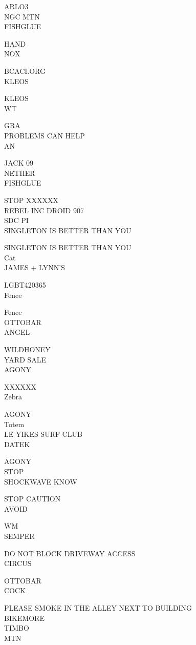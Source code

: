 \documentclass[10pt,letterpaper]{article}
\begin{document}
ARLO3\\
NGC MTN\\
FISHGLUE

HAND\\
NOX

BCACI.ORG\\
KLEOS

KLEOS\\
WT

GRA\\
PROBLEMS CAN HELP\\
AN

JACK 09\\
NETHER\\
FISHGLUE

STOP XXXXXX\\
REBEL INC DROID 907\\
SDC PI\\
SINGLETON IS BETTER THAN YOU

SINGLETON IS BETTER THAN YOU\\
Cat\\
JAMES + LYNN'S

LGBT420365\\
Fence

Fence\\
OTTOBAR\\
ANGEL

WILDHONEY\\
YARD SALE\\
AGONY

XXXXXX\\
Zebra

AGONY\\
Totem\\
LE YIKES SURF CLUB\\
DATEK

AGONY\\
STOP\\
SHOCKWAVE KNOW

STOP CAUTION\\
AVOID

WM\\
SEMPER

DO NOT BLOCK DRIVEWAY ACCESS\\
CIRCUS

OTTOBAR\\
COCK

PLEASE SMOKE IN THE ALLEY NEXT TO BUILDING\\
BIKEMORE\\
TIMBO\\
MTN
\end{document}
